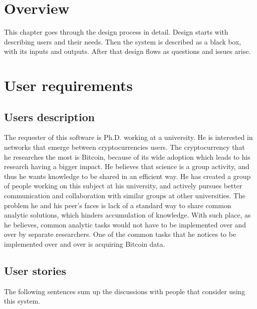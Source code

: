 \documentclass[12pt, en, eng, twoside, final]{mgr}
\begin{document}
\section{Overview}
This chapter goes through the design process in detail. Design starts with describing users and their needs. Then the system is described as a black box, with its inputs and outputs. After that design flows as questions and issues arise. 

\section{User requirements}

\subsection{Users description}

The requester of this software is Ph.D. working at a university. He is interested in networks that emerge between cryptocurrencies users. The cryptocurrency that he researches the most is Bitcoin, because of its wide adoption which leads to his research having a bigger impact. He believes that science is a group activity, and thus he wants knowledge to be shared in an efficient way. He has created a group of people working on this subject at his university, and actively pursues better communication and collaboration with similar groups at other universities. The problem he and his peer's faces is lack of a standard way to share common analytic solutions, which hinders accumulation of knowledge. With such place, as he believes, common analytic tasks would not have to be implemented over and over by separate researchers. One of the common tasks that he notices to be implemented over and over is acquiring Bitcoin data.  

\subsection{User stories}

The following sentences sum up the discussions with people that consider using this system.
\end{document}
